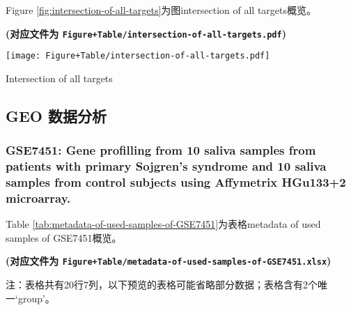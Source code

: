 \documentclass[
]{article}
\begin{document}
Figure \ref{fig:intersection-of-all-targets}为图intersection of all targets概览。

\textbf{(对应文件为 \texttt{Figure+Table/intersection-of-all-targets.pdf})}

\def\@captype{figure}
\begin{center}
\texttt{[image: Figure+Table/intersection-of-all-targets.pdf]}
\caption{Intersection of all targets}\label{fig:intersection-of-all-targets}
\end{center}

\hypertarget{geo-ux6570ux636eux5206ux6790}{%
\subsection{GEO 数据分析}\label{geo-ux6570ux636eux5206ux6790}}

\hypertarget{gse7451-gene-profilling-from-10-saliva-samples-from-patients-with-primary-sojgrens-syndrome-and-10-saliva-samples-from-control-subjects-using-affymetrix-hgu1332-microarray.}{%
\subsubsection{GSE7451: Gene profilling from 10 saliva samples from patients with primary Sojgren's syndrome and 10 saliva samples from control subjects using Affymetrix HGu133+2 microarray.}\label{gse7451-gene-profilling-from-10-saliva-samples-from-patients-with-primary-sojgrens-syndrome-and-10-saliva-samples-from-control-subjects-using-affymetrix-hgu1332-microarray.}}

Table \ref{tab:metadata-of-used-samples-of-GSE7451}为表格metadata of used samples of GSE7451概览。

\textbf{(对应文件为 \texttt{Figure+Table/metadata-of-used-samples-of-GSE7451.xlsx})}

\begin{center}\begin{tcolorbox}[colback=gray!10, colframe=gray!50, width=0.9\linewidth, arc=1mm, boxrule=0.5pt]注：表格共有20行7列，以下预览的表格可能省略部分数据；表格含有2个唯一`group'。
\end{tcolorbox}
\end{center}
\end{document}
